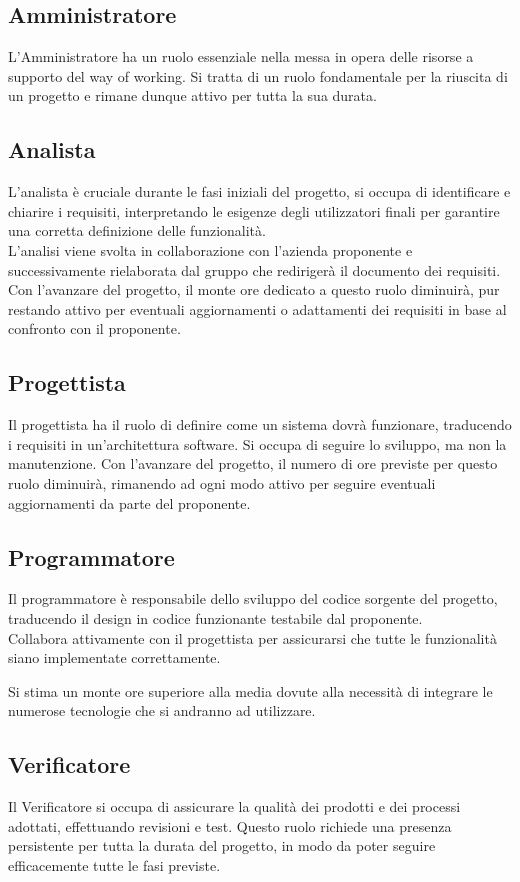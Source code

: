 \documentclass{article}
\begin{document}
		\subsection{Amministratore}
		L'Amministratore ha un ruolo essenziale nella messa in opera delle risorse a supporto del way of working.
		Si tratta di un ruolo fondamentale per la riuscita di un progetto e rimane dunque attivo per tutta la sua durata.

		\subsection{Analista}
		L'analista è cruciale durante le fasi iniziali del progetto, si occupa di identificare e chiarire i requisiti, interpretando le esigenze degli utilizzatori finali per garantire una corretta definizione delle funzionalità.\\
		L'analisi viene svolta in collaborazione con l'azienda proponente e successivamente rielaborata dal gruppo che redirigerà il documento dei requisiti.\\
		Con l’avanzare del progetto, il monte ore dedicato a questo ruolo diminuirà, pur restando attivo per eventuali aggiornamenti o adattamenti dei requisiti in base al confronto con il proponente.
		\subsection{Progettista}
		Il progettista ha il ruolo di definire come un sistema dovrà funzionare, traducendo i requisiti in un'architettura software.
		Si occupa di seguire lo sviluppo, ma non la manutenzione.
		Con l'avanzare del progetto, il numero di ore previste per questo ruolo diminuirà, rimanendo ad ogni modo attivo per seguire eventuali aggiornamenti da parte del proponente.

		\subsection{Programmatore}
		Il programmatore è responsabile dello sviluppo del codice sorgente del progetto, traducendo il design in codice funzionante testabile dal proponente.\\
		Collabora attivamente con il progettista per assicurarsi che tutte le funzionalità siano implementate correttamente.

		Si stima un monte ore superiore alla media dovute alla necessità di integrare le numerose tecnologie che si andranno ad utilizzare.
		\subsection{Verificatore}
		Il Verificatore si occupa di assicurare la qualità dei prodotti e dei processi adottati, effettuando revisioni e test. 
		Questo ruolo richiede una presenza persistente per tutta la durata del progetto, in modo da poter seguire efficacemente tutte le fasi previste.
		
\end{document}
